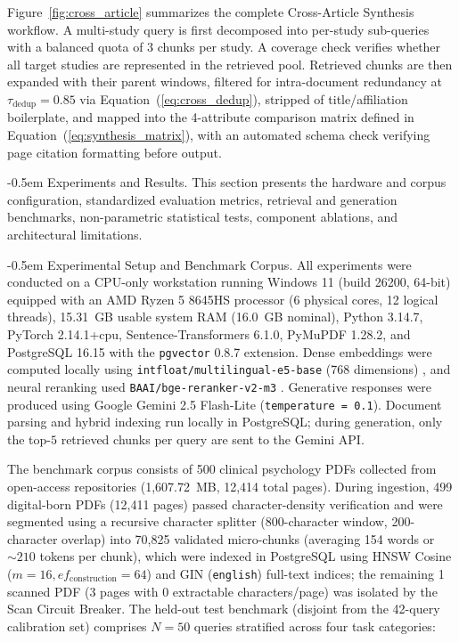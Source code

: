\documentclass[10pt]{SPIIRAS_Proceedings}
\makeatletter
\renewcommand\section{\@startsection{section}{1}{\parindent}%
  {\z@}%
  {-0.5em}%
  {\normalfont\normalsize\bfseries}}
\renewcommand\subsection{\@startsection{subsection}{2}{\parindent}%
  {\z@}%
  {-0.5em}%
  {\normalfont\normalsize\bfseries}}
\makeatother
\begin{document}
Figure~\ref{fig:cross_article} summarizes the complete Cross-Article Synthesis workflow. A multi-study query is first decomposed into per-study sub-queries with a balanced quota of 3 chunks per study. A coverage check verifies whether all target studies are represented in the retrieved pool. Retrieved chunks are then expanded with their parent windows, filtered for intra-document redundancy at $\tau_{\mathrm{dedup}} = 0.85$ via Equation~(\ref{eq:cross_dedup}), stripped of title/affiliation boilerplate, and mapped into the 4-attribute comparison matrix defined in Equation~(\ref{eq:synthesis_matrix}), with an automated schema check verifying page citation formatting before output.

\section{Experiments and Results.} \label{sec:experiments_setup} This section presents the hardware and corpus configuration, standardized evaluation metrics, retrieval and generation benchmarks, non-parametric statistical tests, component ablations, and architectural limitations.

\subsection{Experimental Setup and Benchmark Corpus.} All experiments were conducted on a CPU-only workstation running Windows 11 (build 26200, 64-bit) equipped with an AMD Ryzen 5 8645HS processor (6 physical cores, 12 logical threads), 15.31~GB usable system RAM (16.0~GB nominal), Python 3.14.7, PyTorch 2.14.1+cpu, Sentence-Transformers 6.1.0, PyMuPDF 1.28.2, and PostgreSQL 16.15 with the \texttt{pgvector} 0.8.7 extension. Dense embeddings were computed locally using \texttt{intfloat/multilingual-e5-base} (768 dimensions) \cite{wang2022text}, and neural reranking used \texttt{BAAI/bge-reranker-v2-m3} \cite{chen2024bge,baai2024bgererankerv2m3}. Generative responses were produced using Google Gemini 2.5 Flash-Lite (\texttt{temperature = 0.1}). Document parsing and hybrid indexing run locally in PostgreSQL; during generation, only the top-$5$ retrieved chunks per query are sent to the Gemini API.

The benchmark corpus consists of 500 clinical psychology PDFs collected from open-access repositories (1,607.72~MB, 12,414 total pages). During ingestion, 499 digital-born PDFs (12,411 pages) passed character-density verification and were segmented using a recursive character splitter (800-character window, 200-character overlap) into 70,825 validated micro-chunks (averaging 154 words or $\sim 210$ tokens per chunk), which were indexed in PostgreSQL using HNSW Cosine ($m = 16, ef_{\mathrm{construction}} = 64$) and GIN (\texttt{english}) full-text indices; the remaining 1 scanned PDF (3 pages with 0 extractable characters/page) was isolated by the Scan Circuit Breaker. The held-out test benchmark (disjoint from the 42-query calibration set) comprises $N = 50$ queries stratified across four task categories:
\end{document}
